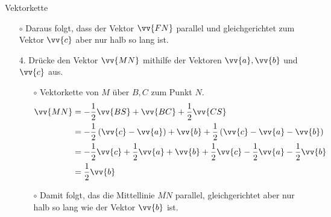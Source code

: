 \begin{bsp}{Vektorkette}{}
\begin{multicols}{2}
\begin{itemize}
    \end{itemize}
   \end{multicols}
   \begin{itemize}
       \item[$\circ$] Daraus folgt, dass der Vektor $\vv{FN}$ parallel und gleichgerichtet zum Vektor $\vv{c}$ aber nur halb so lang ist.
   \end{itemize}
   \begin{enumerate}
    \item[4.] Drücke den Vektor $\vv{MN}$ mithilfe der Vektoren $\vv{a}, \vv{b}$ und $\vv{
    c}$ aus.
    \begin{multicols}{2}
    \begin{itemize}
        \item[$\circ$] Vektorkette von $M$ über $B, C$ zum Punkt $N$.
     \begin{equation*}
            \begin{split}
                \vv{MN} &= - \dfrac{1}{2}\vv{BS} + \vv{BC} + \dfrac{1}{2} \vv{CS}\\
                &= -\dfrac{1}{2} \left( \vv{c} - \vv{a}\right) +\vv{b} + \dfrac{1}{2} \left(\vv{c} - \vv{a} -\vv{b}\right)\\
                &= -\dfrac{1}{2} \vv{c} +\dfrac{1}{2} \vv{a} +\vv{b} + \dfrac{1}{2} \vv{c} - \dfrac{1}{2}\vv{a} -\dfrac{1}{2}\vv{b}\\
                &= \dfrac{1}{2} \vv{b}
            \end{split}
        \end{equation*}  
        \item[$\circ$] Damit folgt, das die Mittellinie $\overline{MN}$ parallel, gleichgerichtet aber nur halb so lang wie der Vektor $\vv{b}$ ist.
    \end{itemize}
    \end{multicols}
\end{enumerate}
\end{bsp}
